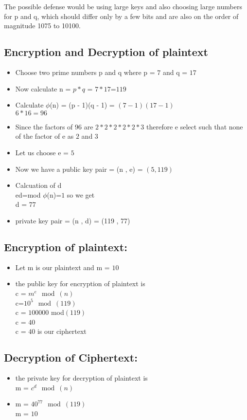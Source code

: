 \documentclass[12pt,a4paper]{article}
\begin{document}
The possible defense would be using large keys and also choosing large
numbers for p and q, which should differ only by a few bits and are also on
the order of magnitude 1075 to 10100.

	\newpage
	\subsection{Encryption and Decryption of plaintext}
	\begin{itemize}
		\item Choose two prime numbers p and q where p = $7$ and q = $17$
		\item Now calculate n = $p*q$ = $7*17$=$119$
		\item Calculate $\phi$(n) = (p - 1)(q - 1) = $(7 - 1)(17 - 1) $\\ $6*16 = 96$
		
		\item Since the factors of $96$ are $2*2*2*2*2*3$ therefore e select such that none of the factor of e as $2$ and $3$ 
		\item Let us choose e = $5$
		\item Now we have a public key pair = (n , e) = $(5,119)$
		\item Calcuation of d\\ ed=mod $\phi$(n)=$1$ so we get\\ d = $77$
		\item private key pair = (n , d) = (119 , 77)
	\end{itemize}
	\subsection{Encryption of plaintext:}
	\begin{itemize}
		\item Let m is our plaintext and m = $10$
		\item the public key for encryption of plaintext is \\ c = $m^e \mod(n)$ \\ c=$ 10^5 \mod(119)$\\ c = $100000$ mod$(119)$\\ c = $40$\\ c = $40$ is our ciphertext
	\end{itemize}
	\subsection{Decryption of Ciphertext:}
	\begin{itemize}
		\item the private key for decryption of plaintext is\\ m = $c^d \mod(n)$
		\item m = $40^{77} \mod(119)$\\ m = $10$
	\end{itemize}
	
\end{document}
